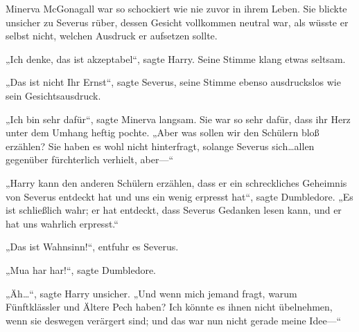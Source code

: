 Minerva McGonagall war so schockiert wie nie zuvor in ihrem Leben. Sie blickte unsicher zu Severus rüber, dessen Gesicht vollkommen neutral war, als wüsste er selbst nicht, welchen Ausdruck er aufsetzen sollte.

„Ich denke, das ist akzeptabel“, sagte Harry. Seine Stimme klang etwas seltsam.

„Das ist nicht Ihr Ernst“, sagte Severus, seine Stimme ebenso ausdruckslos wie sein Gesichtsausdruck.

„Ich bin sehr dafür“, sagte Minerva langsam. Sie war so sehr dafür, dass ihr Herz unter dem Umhang heftig pochte. „Aber was sollen wir den Schülern bloß erzählen? Sie haben es wohl nicht hinterfragt, solange Severus sich…allen gegenüber fürchterlich verhielt, aber—“

„Harry kann den anderen Schülern erzählen, dass er ein schreckliches Geheimnis von Severus entdeckt hat und uns ein wenig erpresst hat“, sagte Dumbledore. „Es ist schließlich wahr; er hat entdeckt, dass Severus Gedanken lesen kann, und er hat uns wahrlich erpresst.“

„Das ist Wahnsinn!“, entfuhr es Severus.

„Mua har har!“, sagte Dumbledore.

„Äh…“, sagte Harry unsicher. „Und wenn mich jemand fragt, warum Fünftklässler und Ältere Pech haben? Ich könnte es ihnen nicht übelnehmen, wenn sie deswegen verärgert sind; und das war nun nicht gerade meine Idee—“


